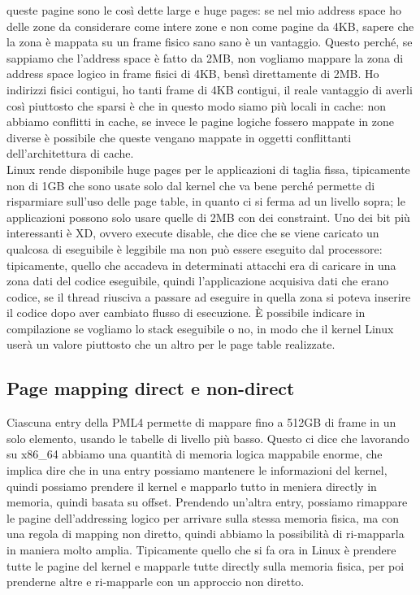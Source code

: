 \documentclass[12pt, oneside]{extbook}
\begin{document}
queste pagine sono le così dette large e huge pages: se nel mio address space ho delle zone da considerare come intere zone e non come pagine da 4KB, sapere che la zona è mappata su un frame fisico sano sano è un vantaggio. Questo perché, se sappiamo che l'address space è fatto da 2MB, non vogliamo mappare la zona di address space logico in frame fisici di 4KB, bensì direttamente di 2MB. Ho indirizzi fisici contigui, ho tanti frame di 4KB contigui, il reale vantaggio di averli così piuttosto che sparsi è che in questo modo siamo più locali in cache: non abbiamo conflitti in cache, se invece le pagine logiche fossero mappate in zone diverse è possibile che queste vengano mappate in oggetti conflittanti dell'architettura di cache.\\ Linux rende disponibile huge pages per le applicazioni di taglia fissa, tipicamente non di 1GB che sono usate solo dal kernel che va bene perché permette di risparmiare sull'uso delle page table, in quanto ci si ferma ad un livello sopra; le applicazioni possono solo usare quelle di 2MB con dei constraint. Uno dei bit più interessanti è XD, ovvero execute disable, che dice che se viene caricato un qualcosa di eseguibile è leggibile ma non può essere eseguito dal processore: tipicamente, quello che accadeva in determinati attacchi era di caricare in una zona dati del codice eseguibile, quindi l'applicazione acquisiva dati che erano codice, se il thread riusciva a passare ad eseguire in quella zona si poteva inserire il codice dopo aver cambiato flusso di esecuzione. È possibile indicare in compilazione se vogliamo lo stack eseguibile o no, in modo che il kernel Linux userà un valore piuttosto che un altro per le page table realizzate.
\subsection{Page mapping direct e non-direct}
Ciascuna entry della PML4 permette di mappare fino a 512GB di frame in un solo elemento, usando le tabelle di livello più basso. Questo ci dice che lavorando su x86\_64 abbiamo una quantità di memoria logica mappabile enorme, che implica dire che in una entry possiamo mantenere le informazioni del kernel, quindi possiamo prendere il kernel e mapparlo tutto in meniera directly in memoria, quindi basata su offset. Prendendo un'altra entry, possiamo rimappare le pagine dell'addressing logico per arrivare sulla stessa memoria fisica, ma con una regola di mapping non diretto, quindi abbiamo la possibilità di ri-mapparla in maniera molto amplia. Tipicamente quello che si fa ora in Linux è prendere tutte le pagine del kernel e mapparle tutte directly sulla memoria fisica, per poi prenderne altre e ri-mapparle con un approccio non diretto.
\end{document}
